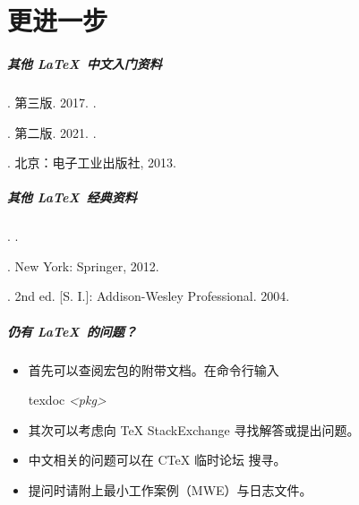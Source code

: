 
\part{更进一步}

\begin{frame}
  \frametitle{其他 \LaTeX\ 中文入门资料}
  \begin{mybibliography}
    \item {}
     . 第三版. 2017.
    .

    \item {}
     . 第二版. 2021.
    .

    \item {}
     . 
    北京：电子工业出版社, 2013.
  \end{mybibliography}
\end{frame}

\begin{frame}
  \frametitle{其他 \LaTeX\ 经典资料}
  \begin{mybibliography}
    \item {}
     . 
    .

    \item {}
     . New York: Springer, 2012. 

    \item {}
     . 2nd ed. [S. I.]: Addison-Wesley Professional. 2004.
  \end{mybibliography}
\end{frame}

\begin{frame}
  \frametitle{仍有 \LaTeX\ 的问题？}
  \begin{itemize}
    \item 首先可以查阅宏包的附带文档。在命令行输入
    
    \hfill
    \begin{minipage}{0.3\textwidth}
      \begin{exampleblock}{\faTerminal}
        \ttfamily
        texdoc \textit{<pkg>}
      \end{exampleblock}
    \end{minipage}
    \item 其次可以考虑向 \TeX{} StackExchange  寻找解答或提出问题。
    \item 中文相关的问题可以在 C\TeX{} 临时论坛  搜寻。
    \item 提问时请附上最小工作案例（MWE）与日志文件。
  \end{itemize}
\end{frame}

